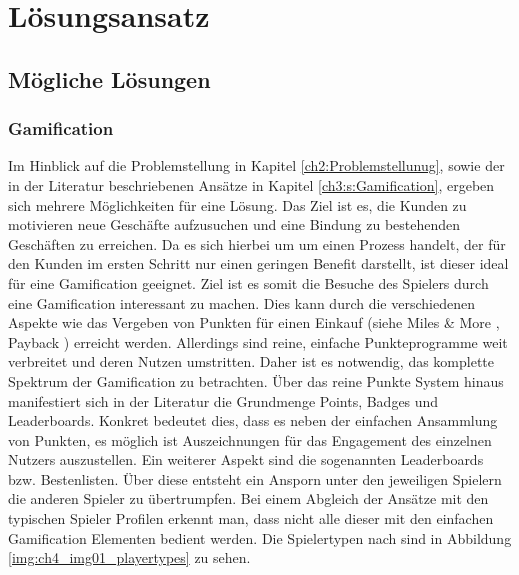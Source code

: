 \chapter{Lösungsansatz}
\label{ch:S4_Lösungsansatz}

\section{Mögliche Lösungen}
\label{ch4:s:Lösungen}

\subsection*{Gamification}


Im Hinblick auf die Problemstellung in Kapitel \ref{ch2:Problemstellunug}, sowie der in der Literatur beschriebenen Ansätze in Kapitel \ref{ch3:s:Gamification}, ergeben sich mehrere Möglichkeiten für eine Lösung. Das Ziel ist es, die Kunden zu motivieren neue Geschäfte aufzusuchen und eine Bindung zu bestehenden Geschäften zu erreichen. Da es sich hierbei um um einen Prozess handelt, der für den Kunden im ersten Schritt nur einen geringen Benefit darstellt, ist dieser ideal für eine Gamification geeignet.\cite{Leigh.2012} Ziel ist es somit die Besuche des Spielers durch eine Gamification interessant zu machen. Dies kann durch die verschiedenen Aspekte wie das Vergeben von Punkten für einen Einkauf (siehe Miles \& More \cite{Wagner.2005}, Payback \cite{Roesl.2005}) erreicht werden. Allerdings sind reine, einfache Punkteprogramme weit verbreitet und deren Nutzen umstritten.\cite{Schmitt.2001}
Daher ist es notwendig, das komplette Spektrum der Gamification zu betrachten.
Über das reine Punkte System hinaus manifestiert sich in der Literatur die Grundmenge \glqq Points, Badges und Leaderboards\grqq.
Konkret bedeutet dies, dass es neben der einfachen Ansammlung von Punkten, es möglich ist Auszeichnungen für das Engagement des einzelnen Nutzers auszustellen. Ein weiterer Aspekt sind die sogenannten Leaderboards bzw. Bestenlisten. Über diese entsteht ein Ansporn unter den jeweiligen Spielern die anderen Spieler zu übertrumpfen. Bei einem Abgleich der Ansätze mit den typischen Spieler Profilen erkennt man, dass nicht alle dieser mit den einfachen Gamification Elementen bedient werden. Die Spielertypen nach \textcite{Bartle.2004} sind in Abbildung \ref{img:ch4_img01_playertypes} zu sehen.

